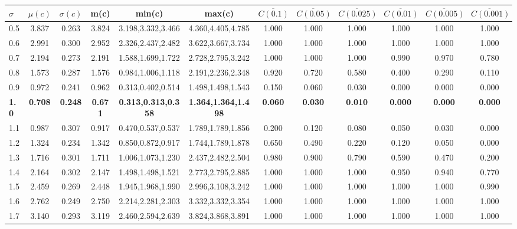 \begin{table*}[h!]
\begin{center}
\begin{tabular}{| l | c | c | c | c | c | c | c | c | c | c | c |}\hline
$\sigma$ & $\mu(c)$ & $\sigma(c)$ & m(c) & min(c) & max(c) & $\overline{C(0.1)}$ & $\overline{C(0.05)}$ & $\overline{C(0.025)}$ & $\overline{C(0.01)}$ & $\overline{C(0.005)}$ & $\overline{C(0.001)}$ \\\hline\hline
0.5 & 3.837 & 0.263 & 3.824 & 3.198,3.332,3.466 & 4.360,4.405,4.785  & 1.000  & 1.000  & 1.000  & 1.000  & 1.000  & 1.000 \\\hline
0.6 & 2.991 & 0.300 & 2.952 & 2.326,2.437,2.482 & 3.622,3.667,3.734  & 1.000  & 1.000  & 1.000  & 1.000  & 1.000  & 1.000 \\\hline
0.7 & 2.194 & 0.273 & 2.191 & 1.588,1.699,1.722 & 2.728,2.795,3.242  & 1.000  & 1.000  & 1.000  & 0.990  & 0.970  & 0.780 \\\hline
0.8 & 1.573 & 0.287 & 1.576 & 0.984,1.006,1.118 & 2.191,2.236,2.348  & 0.920  & 0.720  & 0.580  & 0.400  & 0.290  & 0.110 \\\hline
0.9 & 0.972 & 0.241 & 0.962 & 0.313,0.402,0.514 & 1.498,1.498,1.543  & 0.150  & 0.060  & 0.030  & 0.000  & 0.000  & 0.000 \\\hline
{\bf 1.0} & {\bf 0.708} & {\bf 0.248} & {\bf 0.671} & {\bf 0.313,0.313,0.358} & {\bf 1.364,1.364,1.498} & {\bf 0.060} & {\bf 0.030} & {\bf 0.010} & {\bf 0.000} & {\bf 0.000} & {\bf 0.000} \\\hline
1.1 & 0.987 & 0.307 & 0.917 & 0.470,0.537,0.537 & 1.789,1.789,1.856  & 0.200  & 0.120  & 0.080  & 0.050  & 0.030  & 0.000 \\\hline
1.2 & 1.324 & 0.234 & 1.342 & 0.850,0.872,0.917 & 1.744,1.789,1.878  & 0.650  & 0.490  & 0.220  & 0.120  & 0.050  & 0.000 \\\hline
1.3 & 1.716 & 0.301 & 1.711 & 1.006,1.073,1.230 & 2.437,2.482,2.504  & 0.980  & 0.900  & 0.790  & 0.590  & 0.470  & 0.200 \\\hline
1.4 & 2.164 & 0.302 & 2.147 & 1.498,1.498,1.521 & 2.773,2.795,2.885  & 1.000  & 1.000  & 1.000  & 0.950  & 0.940  & 0.770 \\\hline
1.5 & 2.459 & 0.269 & 2.448 & 1.945,1.968,1.990 & 2.996,3.108,3.242  & 1.000  & 1.000  & 1.000  & 1.000  & 1.000  & 0.990 \\\hline
1.6 & 2.762 & 0.249 & 2.750 & 2.214,2.281,2.303 & 3.332,3.332,3.354  & 1.000  & 1.000  & 1.000  & 1.000  & 1.000  & 1.000 \\\hline
1.7 & 3.140 & 0.293 & 3.119 & 2.460,2.594,2.639 & 3.824,3.868,3.891  & 1.000  & 1.000  & 1.000  & 1.000  & 1.000  & 1.000 \\\hline

\end{tabular}
\end{center}
\end{table*}
